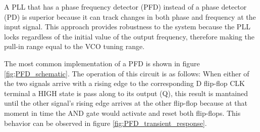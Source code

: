 A PLL that has a phase frequency detector (PFD) instead of a phase detector (PD) is superior because it can track changes in both
phase and frequency at the input signal. This approach provides robustness to the system because the PLL locks regardless of the initial
value of the output frequency, therefore making the pull-in range equal to the VCO tuning range.

\noindent The most common implementation of a PFD is shown in figure \ref{fig;PFD_schematic}. The operation of this circuit is as follows:
When either of the two signals arrive with a rising edge to the corresponding D flip-flop CLK terminal a HIGH state is pass along
to its output (Q), this result is mantained until the other signal's rising edge arrives at the other flip-flop because at that
moment in time the AND gate would activate and reset both flip-flops. This behavior can be observed in figure \ref{fig:PFD_transient_response}.

